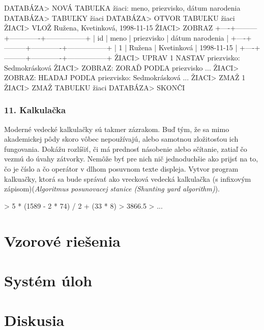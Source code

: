 \begin{code}
DATABÁZA> NOVÁ TABUĽKA žiaci: meno, priezvisko, dátum narodenia
DATABÁZA> TABUĽKY
žiaci
DATABÁZA> OTVOR TABUĽKU žiaci
ŽIACI> VLOŽ Ružena, Kvetinková, 1998-11-15
ŽIACI> ZOBRAZ
   +----+---------+-------------+-----------------+
   | id |  meno   |  priezvisko | dátum narodenia |
   +----+---------+-------------+-----------------+
   | 1  |  Ružena | Kvetinková  |  1998-11-15     |
   +----+---------+-------------+-----------------+
ŽIACI> UPRAV 1 NASTAV priezvisko: Sedmokrásková
ŽIACI> ZOBRAZ: ZORAĎ PODĽA priezvisko
...
ŽIACI> ZOBRAZ: HĽADAJ PODĽA priezvisko: Sedmokrásková
...
ŽIACI> ZMAŽ 1
ŽIACI> ZMAŽ TABUĽKU žiaci
DATABÁZA> SKONČI
\end{code}


\subsubsection*{11. Kalkulačka}
Moderné vedecké kalkulačky sú takmer zázrakom. Buď tým, že sa mimo akademickej pôdy skoro vôbec nepoužívajú, alebo samotnou zložitosťou ich fungovania. Dokážu rozlíšiť, či má prednosť násobenie alebo sčítanie, zatiaľ čo vezmú do úvahy zátvorky. Nemôže byť pre nich nič jednoduchšie ako prijsť na to, čo je číslo a čo operátor v dlhom posuvnom texte displeja. Vytvor program kalkuačky, ktorá sa bude správať ako vrecková vedecká kalkulačka (s infixovým zápisom)(\textit{Algoritmus posunovacej stanice (Shunting yard algorithm)}).

\begin{code}
> 5 * (1589 - 2 * 74) / 2 + (33 * 8)
> 3866.5
> ...
\end{code}

\section{Vzorové riešenia}

\section{Systém úloh}

\section{Diskusia} 

 
